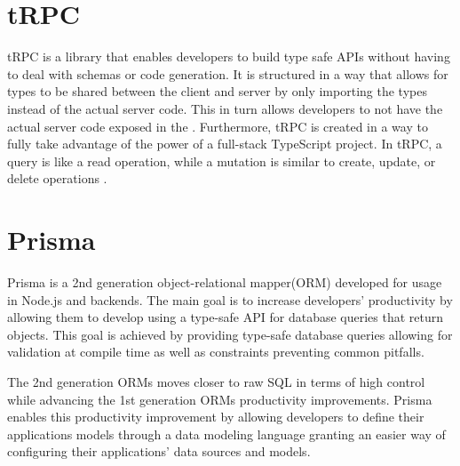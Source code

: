 \section*{tRPC}
tRPC is a library that enables developers to build type safe APIs without having to deal with schemas or code generation.
It is structured in a way that allows for types to be shared between the client and server by only importing the types instead of the actual server code.
This in turn allows developers to not have the actual server code exposed in the \frontend{}.
Furthermore, tRPC is created in a way to fully take advantage of the power of a full-stack TypeScript project\cite{tRPC}.
In tRPC, a query is like  a read operation, while a mutation is similar to create, update, or delete operations .

\section*{Prisma}
Prisma is a 2nd generation object-relational mapper(ORM) developed for usage in Node.js and \typescript{} backends.
The main goal is to increase developers' productivity by allowing them to develop using a type-safe API for database queries that return \javascript{} objects.  
This goal is achieved by providing type-safe database queries allowing for validation at compile time as well as constraints preventing common pitfalls\cite{Prisma_Why}.

The 2nd generation ORMs moves closer to raw SQL in terms of high control while advancing the 1st generation ORMs productivity improvements.
Prisma enables this productivity improvement by allowing developers to define their applications models through a data modeling language granting an easier way of configuring their applications' data sources and models\cite{Prisma_Doc}. 

